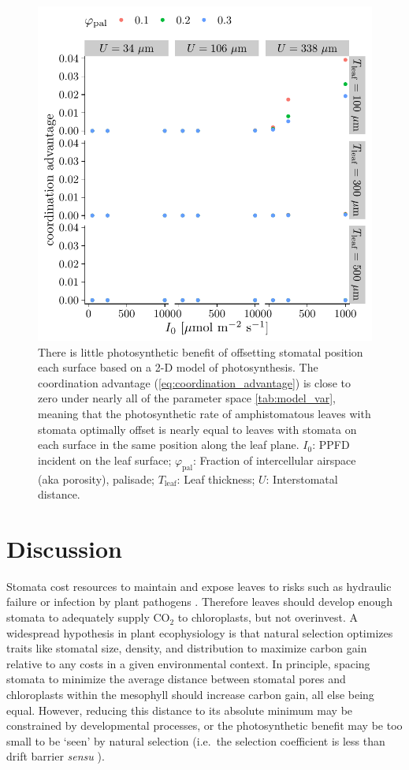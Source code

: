 \documentclass[webpdf,large,modern,unnumsec,namedate]{oup-authoring-template}
\begin{document}
\begin{figure}[ht]
\includegraphics[width = 5in]{figures/model_summary.pdf}
\caption{There is little photosynthetic benefit of offsetting stomatal position each surface based on a 2-D model of photosynthesis. The coordination advantage (\autoref{eq:coordination_advantage}) is close to zero under nearly all of the parameter space \autoref{tab:model_var}, meaning that the photosynthetic rate of amphistomatous leaves with stomata optimally offset is nearly equal to leaves with stomata on each surface in the same position along the leaf plane. $I_0$: PPFD incident on the leaf surface; $\varphi_\text{pal}$: Fraction of intercellular airspace (aka porosity), palisade; $T_\text{leaf}$: Leaf thickness; $U$: Interstomatal distance.}
\label{fig:model_summary}
\end{figure}

\hypertarget{discussion}{%
\section{Discussion}\label{discussion}}

Stomata cost resources to maintain \citep{deans_optimization_2020} and
expose leaves to risks such as hydraulic failure
\citep{wang_theoretical_2020} or infection by plant pathogens
\citep{melotto_stomatal_2017}. Therefore leaves should develop enough
stomata to adequately supply CO\(_2\) to chloroplasts, but not
overinvest. A widespread hypothesis in plant ecophysiology is that
natural selection optimizes traits like stomatal size, density, and
distribution to maximize carbon gain relative to any costs in a given
environmental context. In principle, spacing stomata to minimize the
average distance between stomatal pores and chloroplasts within the
mesophyll should increase carbon gain, all else being equal. However,
reducing this distance to its absolute minimum may be constrained by
developmental processes, or the photosynthetic benefit may be too small
to be `seen' by natural selection (i.e.~the selection coefficient is
less than drift barrier \emph{sensu} \citet{sung_drift-barrier_2012}).
\end{document}
